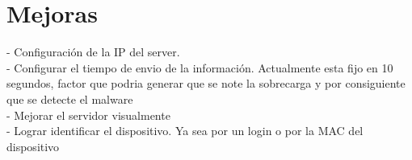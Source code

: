 \section{Mejoras}

- Configuración de la IP del server. \\
- Configurar el tiempo de envio de la información. Actualmente esta fijo en 10 segundos, factor que podria generar que se note la sobrecarga y por consiguiente que se detecte el malware\\
- Mejorar el servidor visualmente\\
- Lograr identificar el dispositivo. Ya sea por un login o por la MAC del dispositivo